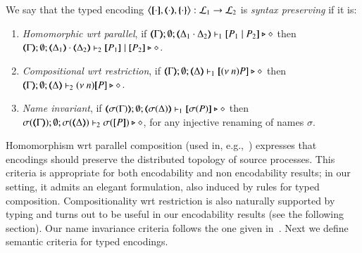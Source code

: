 \begin{definition}\rm
	\label{def:sep}
	We say that 
	the typed encoding 
	$\enco{\map{\cdot}, \mapt{\cdot}, \mapa{\cdot}}: \tyl{L}_1 \to \tyl{L}_2$ is \emph{syntax preserving}
	if it is:
	
	\begin{enumerate}[1.]
		\item	\emph{Homomorphic wrt parallel},   if 
		$\mapt{\Gamma}; \emptyset; \mapt{\Delta_1 \cat \Delta_2} \proves_1 \map{P_1 \Par P_2} \hastype \Proc$
		then \\
		$\mapt{\Gamma}; \emptyset; \mapt{\Delta_1} \cat \mapt{\Delta_2} \proves_2 \map{P_1} \Par \map{P_2} \hastype \Proc$.

		\item	\emph{Compositional wrt restriction},  if 
		$\mapt{\Gamma}; \emptyset; \mapt{\Delta} \proves_1 \map{\news{n}P} \hastype \Proc$
		then \\
		$\mapt{\Gamma}; \emptyset; \mapt{\Delta} \proves_2 \news{n}\map{P} \hastype \Proc$.
		
		\item \emph{Name invariant},   if
		$\mapt{\sigma(\Gamma)}; \emptyset; \mapt{\sigma(\Delta)} \proves_1 \map{\sigma(P)} \hastype \Proc$
		then \\
		$\sigma(\mapt{\Gamma}); \emptyset; \sigma(\mapt{\Delta}) \proves_2 \sigma(\map{P}) \hastype \Proc$, 
		for any injective renaming  of names $\sigma$.
	\end{enumerate}
\end{definition}
%
Homomorphism wrt parallel composition (used in, e.g.,~\cite{Palamidessi03,DBLP:conf/lics/PalamidessiSVV06})
expresses that encodings should preserve the distributed topology of source processes. This criteria 
is appropriate for both encodability and non encodability results; in our setting, 
it admits an elegant formulation, also induced by rules for typed composition.
Compositionality wrt restriction is 
also naturally supported by typing and turns out to be 
useful in our encodability results (see the following section).
Our name invariance criteria follows the one given in~\cite{DBLP:journals/iandc/Gorla10,DBLP:conf/icalp/LanesePSS10}. 
Next we define semantic criteria for typed encodings.

